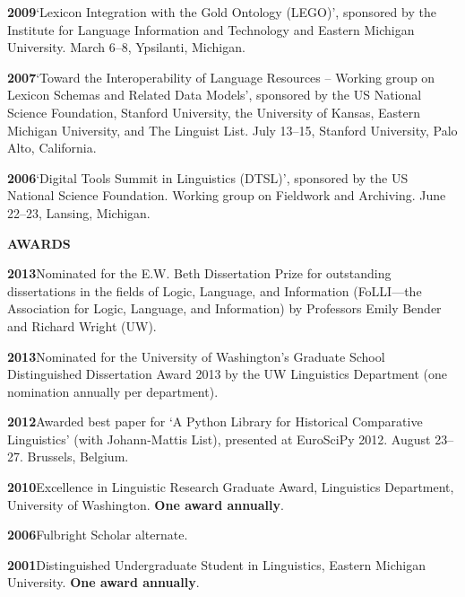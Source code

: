 \documentclass[11pt]{article}
\newcommand{\hangpara}{
 \setlength{\parindent}{0in} %
 \hangindent=0.42in %
}
\begin{document}
\vskip 6pt
\hangpara
{\bf 2009}\hspace{1ex}`Lexicon Integration with the Gold Ontology (LEGO)', sponsored by the Institute for Language Information and Technology and Eastern Michigan University. March 6--8, Ypsilanti, Michigan.

\vskip 6pt
\hangpara
{\bf 2007}\hspace{1ex}`Toward the Interoperability of Language Resources -- Working group on Lexicon Schemas and Related Data Models', sponsored by the US National Science Foundation, Stanford University, the University of Kansas, Eastern Michigan University, and The Linguist List. July 13--15, Stanford University, Palo Alto, California.

\vskip 6pt
\hangpara
{\bf 2006}\hspace{1ex}`Digital Tools Summit in Linguistics (DTSL)', sponsored by the US National Science Foundation. Working group on Fieldwork and Archiving. June 22--23, Lansing, Michigan.


\vskip 20pt
\begin{flushleft}
{\bf AWARDS}
\end{flushleft}

\hangpara
{\bf 2013}\hspace{1ex}Nominated for the E.W. Beth Dissertation Prize for outstanding dissertations in the fields of Logic, Language, and Information (FoLLI---the Association for Logic, Language, and Information) by Professors Emily Bender and Richard Wright (UW).

\vskip 6pt
\hangpara
{\bf 2013}\hspace{1ex}Nominated for the University of Washington's Graduate School Distinguished Dissertation Award 2013 by the UW Linguistics Department (one nomination annually per department).

\vskip 6pt
\hangpara
{\bf 2012}\hspace{1ex}Awarded best paper for `A Python Library for Historical Comparative Linguistics' (with Johann-Mattis List), presented at EuroSciPy 2012. August 23--27. Brussels, Belgium.

\vskip 6pt
\hangpara
{\bf 2010}\hspace{1ex}Excellence in Linguistic Research Graduate Award, Linguistics Department, University of Washington. \textbf{One award annually}.

\vskip 6pt
\hangpara
{\bf 2006}\hspace{1ex}Fulbright Scholar alternate.

\vskip 6pt
\hangpara
{\bf 2001}\hspace{1ex}Distinguished Undergraduate Student in Linguistics, Eastern Michigan University. \textbf{One award annually}.
\end{document}

